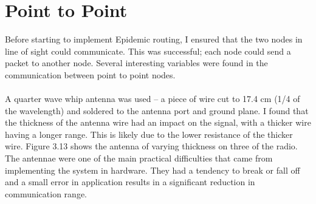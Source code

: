 \documentclass[12pt,a4paper]{report}
\begin{document}
\section{Point to Point}
Before starting to implement Epidemic routing, I ensured that the two nodes in line of sight could communicate. This was successful; each node could send a packet to another node. Several interesting variables were found in the communication between point to point nodes. \\ \\
A quarter wave whip antenna was used -- a piece of wire cut to 17.4 cm (1/4 of the wavelength) and soldered to the antenna port and ground plane. I found that the thickness of the antenna wire had an impact on the signal, with a thicker wire having a longer range. This is likely due to the lower resistance of the thicker wire. Figure 3.13 shows the antenna of varying thickness on three of the radio. The antennae were one of the main practical difficulties that came from implementing the system in hardware. They had a tendency to break or fall off and a small error in application results in a significant reduction in communication range. \\ \\
\end{document}
